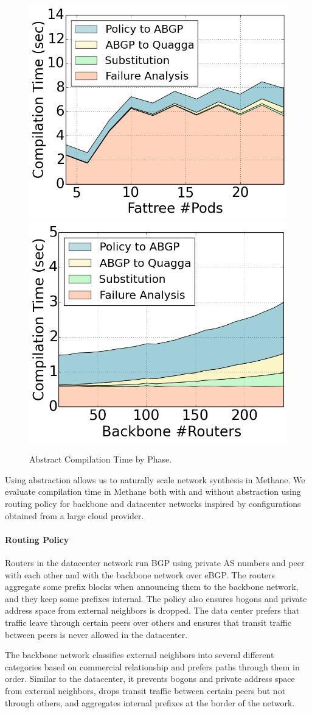 \documentclass[numbers, 10pt, preprint]{sigplanconf}
\newcommand{\sysname}{{\small \sf Methane}\xspace}
\newcommand{\para}[1]{\paragraph*{\textbf{#1}}}
\begin{document}
\begin{figure}[t!]
    {\includegraphics[width=.49\columnwidth]{figures/Fattree-analysis-time.png}}
    {\includegraphics[width=.49\columnwidth]{figures/backbone-analysis-time.png}} \\
  \caption{Abstract Compilation Time by Phase. \label{fig:abstract-breakdown}}
  \vspace{-1em}
\end{figure}

Using abstraction allows us to naturally scale network synthesis in \sysname. We evaluate compilation time in \sysname both with and without abstraction using routing policy for backbone and datacenter networks inspired by configurations obtained from a large cloud provider.

\para{Routing Policy}

Routers in the datacenter network run BGP using private AS numbers and peer with each other and with the backbone network over eBGP. The routers aggregate some prefix blocks when announcing them to the backbone network, and they keep some prefixes internal. The policy also ensures bogons and private address space from external neighbors is dropped. The data center prefers that traffic leave through certain peers over others and ensures that transit traffic between peers is never allowed in the datacenter.

The backbone network classifies external neighbors into several different categories based on commercial relationship and prefers paths through them in order. Similar to the datacenter, it prevents bogons and private address space from external neighbors, drops transit traffic between certain peers but not through others, and aggregates internal prefixes at the border of the network.
\end{document}
